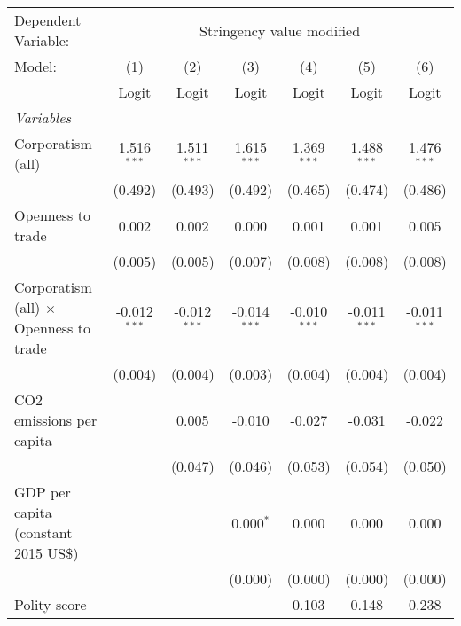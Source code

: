 
\begingroup
\centering
\begin{tabular}{lcccccc}
   \toprule
   Dependent Variable: & \multicolumn{6}{c}{Stringency value modified}\\
   Model:                                        & (1)            & (2)            & (3)            & (4)            & (5)            & (6)\\  
                                                 &  Logit         & Logit          & Logit          & Logit          & Logit          & Logit\\  
   \midrule
   \emph{Variables}\\
   Corporatism (all)                             & 1.516$^{***}$  & 1.511$^{***}$  & 1.615$^{***}$  & 1.369$^{***}$  & 1.488$^{***}$  & 1.476$^{***}$\\   
                                                 & (0.492)        & (0.493)        & (0.492)        & (0.465)        & (0.474)        & (0.486)\\   
   Openness to trade                             & 0.002          & 0.002          & 0.000          & 0.001          & 0.001          & 0.005\\   
                                                 & (0.005)        & (0.005)        & (0.007)        & (0.008)        & (0.008)        & (0.008)\\   
   Corporatism (all) $\times$ Openness to trade  & -0.012$^{***}$ & -0.012$^{***}$ & -0.014$^{***}$ & -0.010$^{***}$ & -0.011$^{***}$ & -0.011$^{***}$\\   
                                                 & (0.004)        & (0.004)        & (0.003)        & (0.004)        & (0.004)        & (0.004)\\   
   CO2 emissions per capita                      &                & 0.005          & -0.010         & -0.027         & -0.031         & -0.022\\   
                                                 &                & (0.047)        & (0.046)        & (0.053)        & (0.054)        & (0.050)\\   
   GDP per capita (constant 2015 US\$)           &                &                & 0.000$^{*}$    & 0.000          & 0.000          & 0.000\\   
                                                 &                &                & (0.000)        & (0.000)        & (0.000)        & (0.000)\\   
   Polity score                                  &                &                &                & 0.103          & 0.148          & 0.238\\   

\end{tabular}
